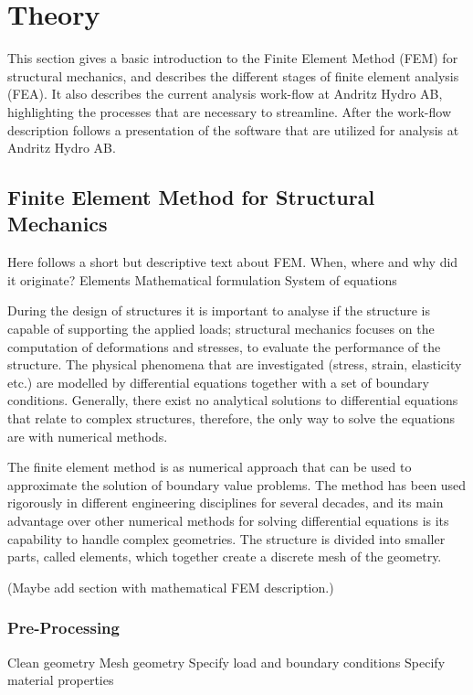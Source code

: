 
\section{Theory} %
\label{sec:theory}
This section gives a basic introduction to the Finite Element Method (FEM) for structural mechanics, and describes the different stages of finite element analysis (FEA). It also describes the current analysis work-flow at Andritz Hydro AB, highlighting the processes that are necessary to streamline. After the work-flow description follows a presentation of the software that are utilized for analysis at Andritz Hydro AB.

\subsection{Finite Element Method for Structural Mechanics} %
\label{sub:finite_element_method_in_structural_mechanics}
Here follows a short but descriptive text about FEM.
When, where and why did it originate?
Elements
Mathematical formulation
System of equations

During the design of structures it is important to analyse if the structure is capable of supporting the applied loads; structural mechanics focuses on the computation of deformations and stresses, to evaluate the performance of the structure. The physical phenomena that are investigated (stress, strain, elasticity etc.) are modelled by differential equations together with a set of boundary conditions. Generally, there exist no analytical solutions to differential equations that relate to complex structures, therefore, the only way to solve the equations are with numerical methods.

The finite element method is as numerical approach that can be used to approximate the solution of boundary value problems. The method has been used rigorously in different engineering disciplines for several decades, and its main advantage over other numerical methods for solving differential equations is its capability to handle complex geometries. The structure is divided into smaller parts, called elements, which together create a discrete mesh of the geometry.~\cite{ottossen92}

(Maybe add section with mathematical FEM description.)


\subsubsection{Pre-Processing} %
\label{ssub:pre_processing}
Clean geometry
Mesh geometry
Specify load and boundary conditions
Specify material properties

